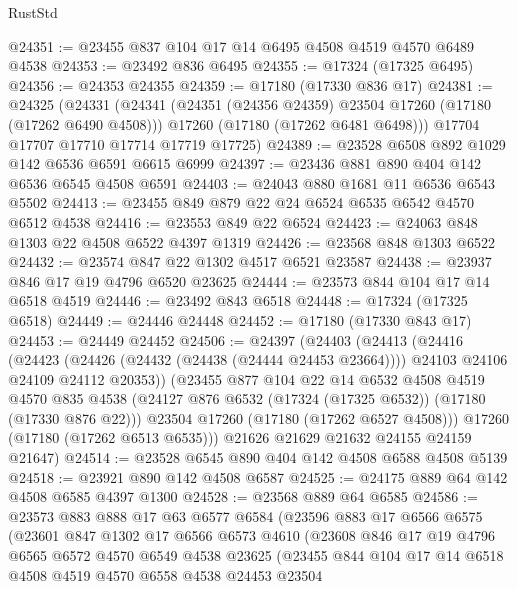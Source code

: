 \begin{lexlean}{RustStd}
\begin{coremodule}
{\begin{coremodule}
{{{{{{{{{{{{{{{{{{{{{{{{{{{{{{{{{{{{{{{{{{{{{{{{{{{{{{{@24351 := @23455 @837 @104 @17 @14 @6495 @4508 @4519 @4570 @6489 @4538
@24353 := @23492 @836 @6495
@24355 := @17324 (@17325 @6495)
@24356 := @24353 @24355
@24359 := @17180 (@17330 @836 @17)
@24381 := @24325
    (@24331
      (@24341
        (@24351 (@24356 @24359) @23504 @17260 (@17180 (@17262 @6490 @4508)))
        @17260
        (@17180 (@17262 @6481 @6498)))
      @17704
      @17707
      @17710
      @17714
      @17719
      @17725)
@24389 := @23528 @6508 @892 @1029 @142 @6536 @6591 @6615 @6999
@24397 := @23436 @881 @890 @404 @142 @6536 @6545 @4508 @6591
@24403 := @24043 @880 @1681 @11 @6536 @6543 @5502
@24413 := @23455 @849 @879 @22 @24 @6524 @6535 @6542 @4570 @6512 @4538
@24416 := @23553 @849 @22 @6524
@24423 := @24063 @848 @1303 @22 @4508 @6522 @4397 @1319
@24426 := @23568 @848 @1303 @6522
@24432 := @23574 @847 @22 @1302 @4517 @6521 @23587
@24438 := @23937 @846 @17 @19 @4796 @6520 @23625
@24444 := @23573 @844 @104 @17 @14 @6518 @4519
@24446 := @23492 @843 @6518
@24448 := @17324 (@17325 @6518)
@24449 := @24446 @24448
@24452 := @17180 (@17330 @843 @17)
@24453 := @24449 @24452
@24506 := @24397
    (@24403
      (@24413
        (@24416
          (@24423
            (@24426 (@24432 (@24438 (@24444 @24453 @23664))))
            @24103
            @24106
            @24109
            @24112
            @20353))
        (@23455
          @877
          @104
          @22
          @14
          @6532
          @4508
          @4519
          @4570
          @835
          @4538
          (@24127 @876 @6532 (@17324 (@17325 @6532)) (@17180 (@17330 @876 @22)))
          @23504
          @17260
          (@17180 (@17262 @6527 @4508)))
        @17260
        (@17180 (@17262 @6513 @6535)))
      @21626
      @21629
      @21632
      @24155
      @24159
      @21647)
@24514 := @23528 @6545 @890 @404 @142 @4508 @6588 @4508 @5139
@24518 := @23921 @890 @142 @4508 @6587
@24525 := @24175 @889 @64 @142 @4508 @6585 @4397 @1300
@24528 := @23568 @889 @64 @6585
@24586 := @23573
    @883
    @888
    @17
    @63
    @6577
    @6584
    (@23596
      @883
      @17
      @6566
      @6575
      (@23601
        @847
        @1302
        @17
        @6566
        @6573
        @4610
        (@23608
          @846
          @17
          @19
          @4796
          @6565
          @6572
          @4570
          @6549
          @4538
          @23625
          (@23455
            @844
            @104
            @17
            @14
            @6518
            @4508
            @4519
            @4570
            @6558
            @4538
            @24453
            @23504
}}}}}}}}}}}}}}}}}}}}}}}}}}}}}}}}}}}}}}}}}}}}}}}}}}}}}}}
\end{coremodule}}
\end{coremodule}
\end{lexlean}
